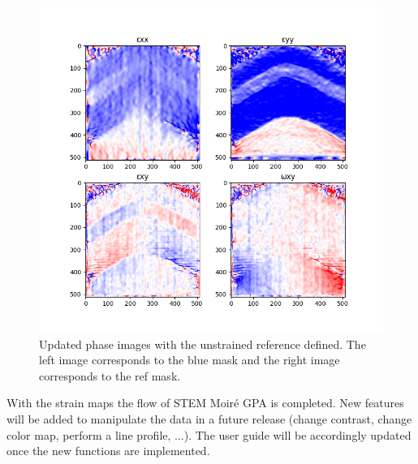 \documentclass[12pt, titlepage]{article}
\newcommand{\progname}{STEM Moir{\'e} GPA}
\begin{document}
\begin{figure}[H]
\centering
\includegraphics[scale=0.6]{Figures/Strain_maps.png}
\caption{Updated phase images with the unstrained reference defined. The left image corresponds to the blue mask and the right image corresponds to the ref mask.}
\label{fig:strain_map}
\end{figure}

With the strain maps the flow of \progname{} is completed. New features will be added to manipulate the data in a future release (change contrast, change color map, perform a line profile, ...). The user guide will be accordingly updated once the new functions are implemented. 




\end{document}
